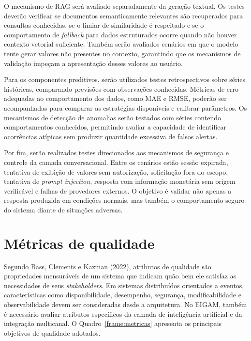 O mecanismo de RAG será avaliado separadamente da geração textual. Os testes deverão verificar se documentos semanticamente relevantes são recuperados para consultas conhecidas, se o limiar de similaridade é respeitado e se o comportamento de \textit{fallback} para dados estruturados ocorre quando não houver contexto vetorial suficiente. Também serão avaliados cenários em que o modelo tente gerar valores não presentes no contexto, garantindo que os mecanismos de validação impeçam a apresentação desses valores ao usuário.

Para os componentes preditivos, serão utilizados testes retrospectivos sobre séries históricas, comparando previsões com observações conhecidas. Métricas de erro adequadas ao comportamento dos dados, como MAE e RMSE, poderão ser acompanhadas para comparar as estratégias disponíveis e calibrar parâmetros. Os mecanismos de detecção de anomalias serão testados com séries contendo comportamentos conhecidos, permitindo avaliar a capacidade de identificar ocorrências atípicas sem produzir quantidade excessiva de falsos alertas.

Por fim, serão realizados testes direcionados aos mecanismos de segurança e controle da camada conversacional. Entre os cenários estão sessão expirada, tentativa de exibição de valores sem autorização, solicitação fora do escopo, tentativa de \textit{prompt injection}, resposta com informação monetária sem origem verificável e falhas de provedores externos. O objetivo é validar não apenas a resposta produzida em condições normais, mas também o comportamento seguro do sistema diante de situações adversas.

\section{Métricas de qualidade}

Segundo Bass, Clements e Kazman (2022), atributos de qualidade são propriedades mensuráveis de um sistema que indicam quão bem ele satisfaz as necessidades de seus \textit{stakeholders}. Em sistemas distribuídos orientados a eventos, características como disponibilidade, desempenho, segurança, modificabilidade e observabilidade devem ser consideradas desde a arquitetura. No EIGAM, também é necessário avaliar atributos específicos da camada de inteligência artificial e da integração multicanal. O Quadro~\ref{frame:metricas} apresenta os principais objetivos de qualidade adotados.

